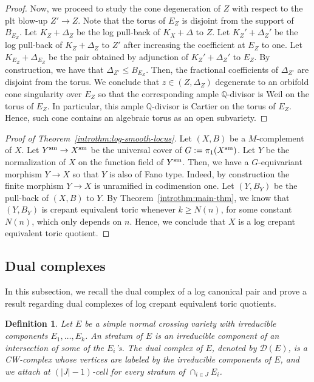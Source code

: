 \documentclass{amsart}
\renewcommand{\qq}{\mathbb{Q}}
\newtheorem{definition}[theorem]{Definition}
\theoremstyle{remark}
\numberwithin{equation}{section}
\begin{document}
\begin{proof}
Now, we proceed to study the cone degeneration of $Z$ with respect to the plt blow-up $Z'\rightarrow Z$.
Note that the torus of $E_Z$ is disjoint from the support of $B_{E_Z}$.
Let $K_Z+\Delta_Z$ be the log pull-back of $K_X+\Delta$ to $Z$.
Let $K_Z'+\Delta_Z'$ be the log pull-back of $K_Z+\Delta_Z$ to $Z'$ after increasing the coefficient at $E_Z$ to one.
Let $K_{E_Z}+\Delta_{E_Z}$ be the pair obtained by adjunction of 
$K_Z'+\Delta_Z'$ to $E_Z$. 
By construction, we have that $\Delta_{Z'}\leq B_{E_Z}$.
Then, the fractional coefficients of $\Delta_{Z'}$ are disjoint from the torus.
We conclude that $z\in (Z,\Delta_Z)$ degenerate to an orbifold cone singularity over $E_Z$ so that the corresponding ample $\qq$-divisor is Weil on the torus of $E_Z$.
In particular, this ample
$\qq$-divisor is Cartier on the torus of $E_Z$.
Hence, such cone contains an algebraic torus as an open subvariety.
\end{proof}

\begin{proof}[Proof of Theorem~\ref{introthm:log-smooth-locus}]
Let $(X,B)$ be a $M$-complement of $X$.
Let $Y^{\rm sm}\rightarrow X^{\rm sm}$ 
be the universal cover of $G:=\pi_1(X^{\rm sm})$.
Let $Y$ be the normalization of $X$ on the function field of $Y^{\rm sm}$.
Then, we have a $G$-equivariant morphism $Y\rightarrow X$ so
that $Y$ is also of Fano type.
Indeed, by construction the finite morphism
$Y\rightarrow X$ is unramified in codimension one.
Let $(Y,B_Y)$ be the pull-back of $(X,B)$ to $Y$.
By Theorem~\ref{introthm:main-thm}, we know that $(Y,B_Y)$ is crepant equivalent  toric whenever $k\geq N(n)$,
for some constant $N(n)$, which only depends on $n$.
Hence, we conclude that $X$ is a log crepant equivalent  toric quotient.
\end{proof}

\subsection{Dual complexes} In this subsection, we recall the dual complex of a log canonical pair and prove a result regarding dual complexes of log crepant equivalent  toric quotients.

\begin{definition}\label{def:dual-complex}{\em 
Let $E$ be a simple normal crossing variety
with irreducible components $E_1,\dots,E_k$.
An {\em stratum} of $E$ is an irreducible component of an intersection of some of the $E_i$'s.
The {\em dual complex} of $E$,
denoted by $\mathcal{D}(E)$,
is a CW-complex whose vertices are labeled by the irreducible components of $E$,
and we attach at $(|J|-1)$-cell for every stratum of $\cap_{i\in J}E_i$.
}
\end{definition}
\end{document}
